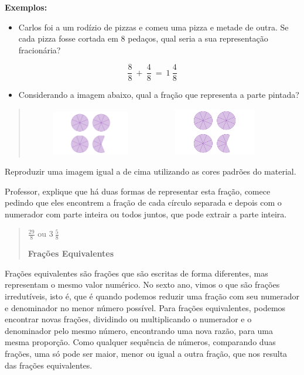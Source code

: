 \textbf{Exemplos:}

\begin{itemize}
\tightlist
\item
  Carlos foi a um rodízio de pizzas e comeu uma pizza e metade de outra.
  Se cada pizza fosse cortada em 8 pedaços, qual seria a sua
  representação fracionária?
\end{itemize}

\[\frac{8}{8}\  + \ \frac{4}{8}\  = \ 1\ \frac{4}{8}\]

\begin{itemize}
\tightlist
\item
  Considerando a imagem abaixo, qual a fração que representa a parte
  pintada?
\end{itemize}

\begin{quote}
\includegraphics[width=2.22515in,height=0.76042in]{./imgSAEB_7_MAT/media/image5.png}\includegraphics[width=2.18869in,height=0.81698in]{./imgSAEB_7_MAT/media/image5.png}
\end{quote}

Reproduzir uma imagem igual a de cima utilizando as cores padrões do
material.

Professor, explique que há duas formas de representar esta fração,
comece pedindo que eles encontrem a fração de cada círculo separada e
depois com o numerador com parte inteira ou todos juntos, que pode
extrair a parte inteira.

\begin{quote}
\(\frac{29}{8}\) ou \(3\ \frac{5}{8}\)

\textbf{Frações Equivalentes}
\end{quote}

Frações equivalentes são frações que são escritas de forma diferentes,
mas representam o mesmo valor numérico. No sexto ano, vimos o que são
frações irredutíveis, isto é, que é quando podemos reduzir uma fração
com seu numerador e denominador no menor número possível. Para frações
equivalentes, podemos encontrar novas frações, dividindo ou
multiplicando o numerador e o denominador pelo mesmo número, encontrando
uma nova razão, para uma mesma proporção. Como qualquer sequência de
números, comparando duas frações, uma só pode ser maior, menor ou igual
a outra fração, que nos resulta das frações equivalentes.

